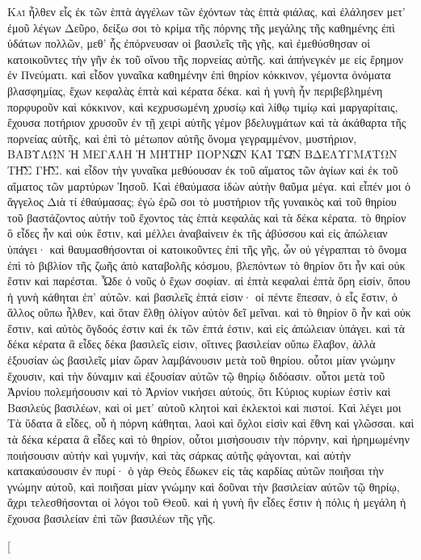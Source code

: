 \begin{pages}
    \begin{Rightside}
        \beginnumbering
		\renewcommand{\LettrineFontHook}{\PHtitl}
		\lettrine[lines=3]{Κ}{αὶ} ἦλθεν εἷς ἐκ τῶν ἑπτὰ ἀγγέλων τῶν ἐχόντων τὰς ἑπτὰ φιάλας, καὶ ἐλάλησεν μετ’ ἐμοῦ λέγων Δεῦρο, δείξω σοι τὸ κρίμα τῆς πόρνης τῆς μεγάλης τῆς καθημένης ἐπὶ ὑδάτων πολλῶν, μεθ’ ἧς ἐπόρνευσαν οἱ βασιλεῖς τῆς γῆς, καὶ ἐμεθύσθησαν οἱ κατοικοῦντες τὴν γῆν ἐκ τοῦ οἴνου τῆς πορνείας αὐτῆς. 
		\pend
		\pstart
		καὶ ἀπήνεγκέν με εἰς ἔρημον ἐν Πνεύματι. καὶ εἶδον γυναῖκα καθημένην ἐπὶ θηρίον κόκκινον, γέμοντα ὀνόματα βλασφημίας, ἔχων κεφαλὰς ἑπτὰ καὶ κέρατα δέκα. καὶ ἡ γυνὴ ἦν περιβεβλημένη πορφυροῦν καὶ κόκκινον, καὶ κεχρυσωμένη χρυσίῳ καὶ λίθῳ τιμίῳ καὶ μαργαρίταις, ἔχουσα ποτήριον χρυσοῦν ἐν τῇ χειρὶ αὐτῆς γέμον βδελυγμάτων καὶ τὰ ἀκάθαρτα τῆς πορνείας αὐτῆς, καὶ ἐπὶ τὸ μέτωπον αὐτῆς ὄνομα γεγραμμένον, μυστήριον, \uppercase{Βαβυλών  ἡ μεγάλη ἡ μήτηρ πορνῶν καὶ τῶν βδελυγμάτων τῆς γῆς}.
		\pend
		\pstart
		καὶ εἶδον τὴν γυναῖκα μεθύουσαν ἐκ τοῦ αἵματος τῶν ἁγίων καὶ ἐκ τοῦ αἵματος τῶν μαρτύρων Ἰησοῦ. Καὶ ἐθαύμασα ἰδὼν αὐτὴν θαῦμα μέγα. καὶ εἶπέν μοι ὁ ἄγγελος Διὰ τί ἐθαύμασας; ἐγὼ ἐρῶ σοι τὸ μυστήριον τῆς γυναικὸς καὶ τοῦ θηρίου τοῦ βαστάζοντος αὐτήν τοῦ ἔχοντος τὰς ἑπτὰ κεφαλὰς καὶ τὰ δέκα κέρατα. τὸ θηρίον ὃ εἶδες ἦν καὶ οὐκ ἔστιν, καὶ μέλλει ἀναβαίνειν ἐκ τῆς ἀβύσσου καὶ εἰς ἀπώλειαν ὑπάγει· καὶ θαυμασθήσονται οἱ κατοικοῦντες ἐπὶ τῆς γῆς, ὧν οὐ γέγραπται τὸ ὄνομα ἐπὶ τὸ βιβλίον τῆς ζωῆς ἀπὸ καταβολῆς κόσμου, βλεπόντων τὸ θηρίον ὅτι ἦν καὶ οὐκ ἔστιν καὶ παρέσται. 
		\pend
		\pstart
		Ὧδε ὁ νοῦς ὁ ἔχων σοφίαν. αἱ ἑπτὰ κεφαλαὶ ἑπτὰ ὄρη εἰσίν, ὅπου ἡ γυνὴ κάθηται ἐπ’ αὐτῶν. καὶ βασιλεῖς ἑπτά εἰσιν· οἱ πέντε ἔπεσαν, ὁ εἷς ἔστιν, ὁ ἄλλος οὔπω ἦλθεν, καὶ ὅταν ἔλθῃ ὀλίγον αὐτὸν δεῖ μεῖναι.
		\pend 
		\pstart
		καὶ τὸ θηρίον ὃ ἦν καὶ οὐκ ἔστιν, καὶ αὐτὸς ὄγδοός ἐστιν καὶ ἐκ τῶν ἑπτά ἐστιν, καὶ εἰς ἀπώλειαν ὑπάγει. καὶ τὰ δέκα κέρατα ἃ εἶδες δέκα βασιλεῖς εἰσιν, οἵτινες βασιλείαν οὔπω ἔλαβον, ἀλλὰ ἐξουσίαν ὡς βασιλεῖς μίαν ὥραν λαμβάνουσιν μετὰ τοῦ θηρίου. οὗτοι μίαν γνώμην ἔχουσιν, καὶ τὴν δύναμιν καὶ ἐξουσίαν αὐτῶν τῷ θηρίῳ διδόασιν. οὗτοι μετὰ τοῦ Ἀρνίου πολεμήσουσιν καὶ τὸ Ἀρνίον νικήσει αὐτούς, ὅτι Κύριος κυρίων ἐστὶν καὶ Βασιλεὺς βασιλέων, καὶ οἱ μετ’ αὐτοῦ κλητοὶ καὶ ἐκλεκτοὶ καὶ πιστοί.
		\pend
		\pstart
		Καὶ λέγει μοι Τὰ ὕδατα ἃ εἶδες, οὗ ἡ πόρνη κάθηται, λαοὶ καὶ ὄχλοι εἰσὶν καὶ ἔθνη καὶ γλῶσσαι. καὶ τὰ δέκα κέρατα ἃ εἶδες καὶ τὸ θηρίον, οὗτοι μισήσουσιν τὴν πόρνην, καὶ ἠρημωμένην ποιήσουσιν αὐτὴν καὶ γυμνήν, καὶ τὰς σάρκας αὐτῆς φάγονται, καὶ αὐτὴν κατακαύσουσιν ἐν πυρί· ὁ γὰρ Θεὸς ἔδωκεν εἰς τὰς καρδίας αὐτῶν ποιῆσαι τὴν γνώμην αὐτοῦ, καὶ ποιῆσαι μίαν γνώμην καὶ δοῦναι τὴν βασιλείαν αὐτῶν τῷ θηρίῳ, ἄχρι τελεσθήσονται οἱ λόγοι τοῦ Θεοῦ. καὶ ἡ γυνὴ ἣν εἶδες ἔστιν ἡ πόλις ἡ μεγάλη ἡ ἔχουσα βασιλείαν ἐπὶ τῶν βασιλέων τῆς γῆς.
		\pend
        \endnumbering
    \end{Rightside}
    \begin{Leftside}
        \beginnumbering
        \pstart[

\end{Leftside}
\end{pages}
